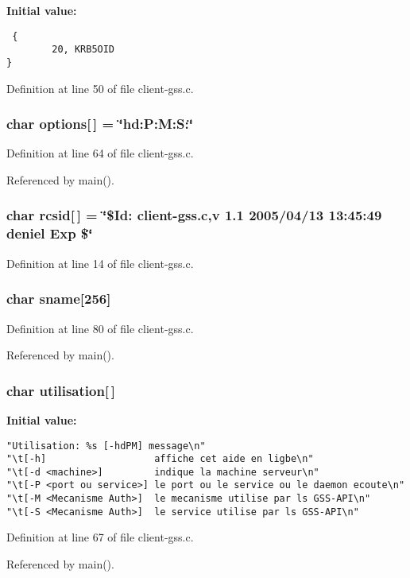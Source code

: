 {\bf Initial value:}

\footnotesize\begin{verbatim} {
        20, KRB5OID
}
\end{verbatim}\normalsize 


Definition at line 50 of file client-gss.c.
\subsubsection{\setlength{\rightskip}{0pt plus 5cm}char {\bf options}[$\,$] = \char`\"{}hd:P:M:S:\char`\"{}}\label{client-gss_8c_a14}




Definition at line 64 of file client-gss.c.

Referenced by main().
\subsubsection{\setlength{\rightskip}{0pt plus 5cm}char {\bf rcsid}[$\,$] = \char`\"{}\$Id: client-gss.c,v 1.1 2005/04/13 13:45:49 deniel Exp \$\char`\"{}}\label{client-gss_8c_a12}




Definition at line 14 of file client-gss.c.
\subsubsection{\setlength{\rightskip}{0pt plus 5cm}char {\bf sname}[256]}\label{client-gss_8c_a19}




Definition at line 80 of file client-gss.c.

Referenced by main().
\subsubsection{\setlength{\rightskip}{0pt plus 5cm}char {\bf utilisation}[$\,$]}\label{client-gss_8c_a15}


{\bf Initial value:}

\footnotesize\begin{verbatim}
"Utilisation: %s [-hdPM] message\n"
"\t[-h]                   affiche cet aide en ligbe\n"
"\t[-d <machine>]         indique la machine serveur\n"
"\t[-P <port ou service>] le port ou le service ou le daemon ecoute\n"
"\t[-M <Mecanisme Auth>]  le mecanisme utilise par ls GSS-API\n" 
"\t[-S <Mecanisme Auth>]  le service utilise par ls GSS-API\n"
\end{verbatim}\normalsize 


Definition at line 67 of file client-gss.c.

Referenced by main().